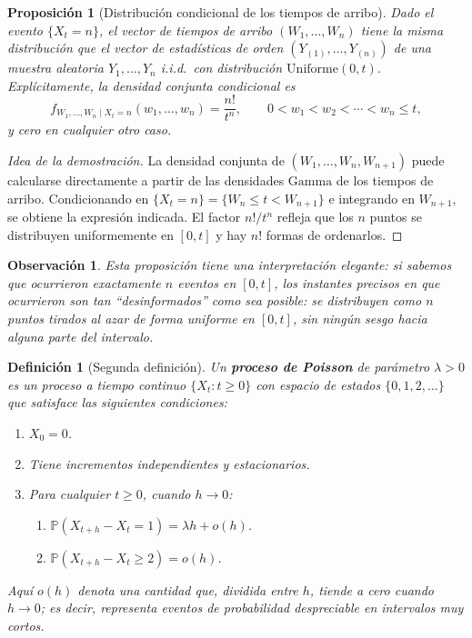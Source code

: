 \documentclass[12pt]{book}
\newtheorem{definition}{Definición}[chapter]
\newtheorem{proposition}{Proposición}[chapter]
\newtheorem{remark}{Observación}[chapter]
\begin{document}
\begin{proposition}[Distribución condicional de los tiempos de arribo]
Dado el evento $\{X_t = n\}$, el vector de tiempos de arribo $(W_1, \ldots, W_n)$ tiene la misma distribución que el vector de estadísticas de orden $(Y_{(1)}, \ldots, Y_{(n)})$ de una muestra aleatoria $Y_1, \ldots, Y_n$ i.i.d.\ con distribución $\mathrm{Uniforme}(0, t)$. Explícitamente, la densidad conjunta condicional es
\[
    f_{W_1,\ldots,W_n \mid X_t = n}(w_1, \ldots, w_n)
    = \frac{n!}{t^n}, \qquad 0 < w_1 < w_2 < \cdots < w_n \le t,
\]
y cero en cualquier otro caso.
\end{proposition}

\begin{proof}[Idea de la demostración]
La densidad conjunta de $(W_1, \ldots, W_n, W_{n+1})$ puede calcularse directamente a partir de las densidades $\mathrm{Gamma}$ de los tiempos de arribo. Condicionando en $\{X_t = n\} = \{W_n \le t < W_{n+1}\}$ e integrando en $W_{n+1}$, se obtiene la expresión indicada. El factor $n!/t^n$ refleja que los $n$ puntos se distribuyen uniformemente en $[0,t]$ y hay $n!$ formas de ordenarlos.
\end{proof}

\begin{remark}
Esta proposición tiene una interpretación elegante: si sabemos que ocurrieron exactamente $n$ eventos en $[0,t]$, los instantes precisos en que ocurrieron son tan ``desinformados'' como sea posible: se distribuyen como $n$ puntos tirados al azar de forma uniforme en $[0,t]$, sin ningún sesgo hacia alguna parte del intervalo.
\end{remark}


\begin{definition}[Segunda definición]
Un \textbf{proceso de Poisson} de parámetro $\lambda > 0$ es un proceso a tiempo continuo $\{X_t : t \ge 0\}$ con espacio de estados $\{0, 1, 2, \ldots\}$ que satisface las siguientes condiciones:
\begin{enumerate}
    \item[\normalfont(a)] $X_0 = 0$.
    \item[\normalfont(b)] Tiene incrementos independientes y estacionarios.
    \item[\normalfont(c)] Para cualquier $t \ge 0$, cuando $h \to 0$:
    \begin{enumerate}
        \item[\normalfont(i)] $\mathbb{P}(X_{t+h} - X_t = 1) = \lambda h + o(h)$.
        \item[\normalfont(ii)] $\mathbb{P}(X_{t+h} - X_t \ge 2) = o(h)$.
    \end{enumerate}
\end{enumerate}
Aquí $o(h)$ denota una cantidad que, dividida entre $h$, tiende a cero cuando $h \to 0$; es decir, representa eventos de probabilidad despreciable en intervalos muy cortos.
\end{definition}
\end{document}

